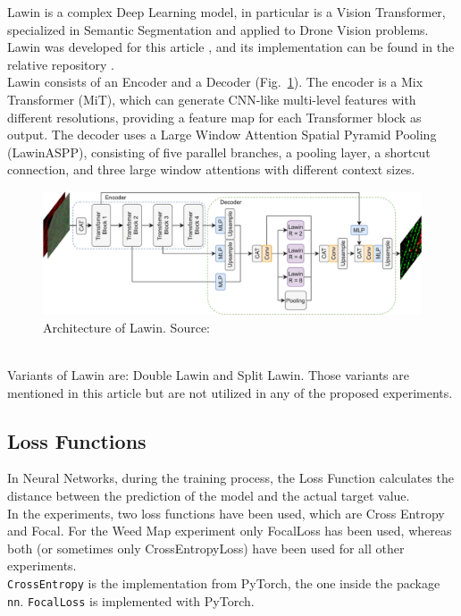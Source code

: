 Lawin is a complex Deep Learning model, in particular is a Vision Transformer, specialized in Semantic Segmentation and applied to Drone Vision problems.
Lawin was developed for this article \cite{WeedMap-PaperThesis}, and its implementation can be found in the relative repository \cite{WeedMap-Repository}.
% 
\\[0.3cm]Lawin consists of an Encoder and a Decoder (Fig.~\ref{fig:figure-3.4.2}).
The encoder is a Mix Transformer (MiT), which can generate CNN-like multi-level features with different resolutions, providing a feature map for each Transformer block as output.
The decoder uses a Large Window Attention Spatial Pyramid Pooling (LawinASPP), consisting of five parallel branches, a pooling layer, a shortcut connection, and three large window attentions with different context sizes.
\begin{figure}[t]
	\centering
	\includegraphics[width=15cm]{figures/figure-3.4.2.png}
	\caption[Architecture of Lawin]{Architecture of Lawin. Source: \cite{WeedMap-PaperThesis}}
	\label{fig:figure-3.4.2}
\end{figure}
% 
\\[0.3cm]Variants of Lawin are: Double Lawin and Split Lawin.
Those variants are mentioned in this article \cite{WeedMap-PaperThesis} but are not utilized in any of the proposed experiments.

\subsection{Loss Functions}

In Neural Networks, during the training process, the Loss Function calculates the distance between the prediction of the model and the actual target value.
\\[0.3cm]In the experiments, two loss functions have been used, which are Cross Entropy and Focal.
For the Weed Map experiment only FocalLoss has been used, whereas both (or sometimes only CrossEntropyLoss) have been used for all other experiments.
\\[0.3cm]\texttt{CrossEntropy} is the implementation from PyTorch, the one inside the package \texttt{nn}. \texttt{FocalLoss} is implemented with PyTorch.

